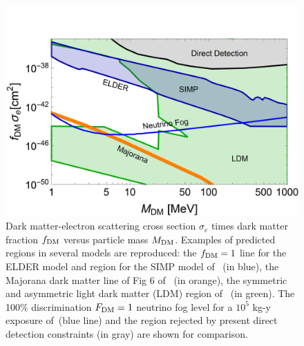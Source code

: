 \begin{figure}[t]
\begin{center}
\includegraphics[width=0.80\columnwidth]{figures/sigmae_plot.jpg}
\caption{Dark matter-electron scattering cross section $\sigma_e$ times dark matter fraction $f_{\rm DM}$ versus particle mass $M_{\rm DM}$. Examples of predicted regions in several models are reproduced: the
$f_{\rm DM}=1$ line for the ELDER model and region for the SIMP model of~\cite{Kuflik:2017iqs} (in blue), the Majorana dark matter line of Fig 6 of~\cite{Battaglieri:2017aum} (in orange), the symmetric and asymmetric light dark matter (LDM) region of~\cite{Lin:2011gj} (in green). The 100\% discrimination $F_{\rm DM } = 1$ neutrino fog level for a $10^5$ kg-y exposure of~\cite{Wyenberg:2018eyv}(blue line) and the region rejected by present direct detection constraints (in gray) are shown for comparison.}
\label{fig:sample_electron}
\end{center}
\end{figure}

